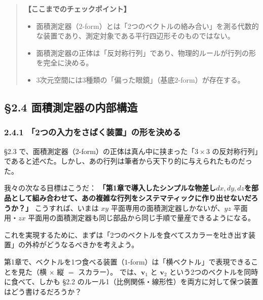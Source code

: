 \documentclass[a4paper,12pt,openany]{book}
\begin{document}
\begin{quote}
\textbf{【ここまでのチェックポイント】}

\begin{itemize}
\item
  面積測定器（\(2\)-form）とは「2つのベクトルの絡み合い」を測る代数的な装置であり、測定対象である平行四辺形そのものではない。
\item
  面積測定器の正体は「反対称行列」であり、物理的ルールが行列の形を完全に決める。
\item
  3次元空間には3種類の「偏った眼鏡」（基底\(2\)-form）が存在する。
\end{itemize}
\end{quote}

\par\vspace{0.35em}\par

\hypertarget{ux9762ux7a4dux6e2cux5b9aux5668ux306eux5185ux90e8ux69cbux9020}{%
\subsection{§2.4
面積測定器の内部構造}\label{ux9762ux7a4dux6e2cux5b9aux5668ux306eux5185ux90e8ux69cbux9020}}

\hypertarget{ux3064ux306eux5165ux529bux3092ux3055ux3070ux304fux88c5ux7f6eux306eux5f62ux3092ux6c7aux3081ux308b}{%
\subsubsection{2.4.1
「2つの入力をさばく装置」の形を決める}\label{ux3064ux306eux5165ux529bux3092ux3055ux3070ux304fux88c5ux7f6eux306eux5f62ux3092ux6c7aux3081ux308b}}

§2.3
で、面積測定器（\(2\)-form）の正体は真ん中に挟まった「\(3 \times 3\)
の反対称行列」であると述べた。しかし、あの行列は筆者から天下り的に与えられたものだった。

我々の次なる目標はこうだ：
\textbf{「第1章で導入したシンプルな物差し}\(dx, dy, dz\)\textbf{を部品として組み合わせて、あの複雑な行列をシステマティックに作り出せないだろうか？」}
こうすれば、いまは \(xy\) 平面専用の面積測定器しかないが、\(yz\)
平面用・\(zx\)
平面用の面積測定器も同じ部品から同じ手順で量産できるようになる。

これを実現するために、まずは「2つのベクトルを食べてスカラーを吐き出す装置」の外枠がどうなるべきかを考えよう。

第1章で、ベクトルを1つ食べる装置（\(1\)-form）は「横ベクトル」で表現できることを見た（横
\(\times\) 縦 \(=\) スカラー）。 では、\(\mathbf{v}_1\) と
\(\mathbf{v}_2\) という2つのベクトルを同時に食べて、しかも §2.2
のルール1（比例関係・線形性）を両方に対して保つ装置はどう書けるだろうか？
\end{document}
